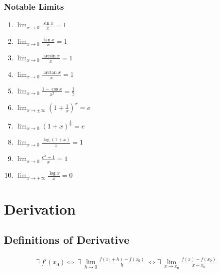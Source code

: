 \documentclass[a4paper]{report}
\begin{document}
\subsection{\textbf{Notable Limits}}
\begin{tcolorbox}
\begin{enumerate}
    \item $\lim_{x \to 0}\frac{\sin x}{x}=1$
    \item $\lim_{x \to 0}\frac{\tan x}{x}=1$
    \item $\lim_{x \to 0}\frac{\arcsin x}{x}=1$
    \item $\lim_{x \to 0}\frac{\arctan x}{x}=1$
    \item $\lim_{x \to 0}\frac{1 - \cos x}{x^{2}}=\frac{1}{2}$
    \item $\lim_{x \to \pm \infty}\left ( 1+\frac{1}{x} \right )^{x} = e$
    \item $\lim_{x \to 0} \left ( 1 + x \right )^{\frac{1}{x}} = e$
    \item $\lim_{x \to 0} \frac{\log\left ( 1+x \right )}{x}=1$
    \item $\lim_{x \to 0} \frac{e^{x}-1}{x}=1$
    \item $\lim_{x \to + \infty} \frac{\log x}{x}=0$
\end{enumerate}
\end{tcolorbox}
\chapter{\textbf{Derivation}}
\section{Definitions of Derivative}
\begin{align}
    \exists \ f'\left ( x_{0} \right ) \Leftrightarrow \ \exists \ \underset{h \to 0}{\lim} \frac{f\left ( x_{0}+h \right ) - f\left ( x_{0} \right )}{h} \ \Leftrightarrow \exists \ \underset{x \to x_{0}}{\lim} \frac{f\left ( x \right ) - f\left ( x_{0} \right )}{x - x_{0}}
\end{align}
\end{document}
